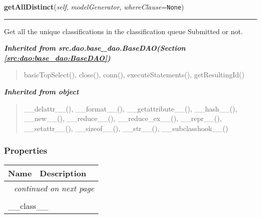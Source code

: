     \vspace{0.5ex}

\hspace{.8\funcindent}\begin{boxedminipage}{\funcwidth}

    \raggedright \textbf{getAllDistinct}(\textit{self}, \textit{modelGenerator}, \textit{whereClause}={\tt None})

    \vspace{-1.5ex}

    \rule{\textwidth}{0.5\fboxrule}
\setlength{\parskip}{2ex}
    Get all the unique classifications in the classification queue 
    Submitted or not.

\setlength{\parskip}{1ex}
    \end{boxedminipage}


\large{\textbf{\textit{Inherited from src.dao.base\_dao.BaseDAO\textit{(Section \ref{src:dao:base_dao:BaseDAO})}}}}

\begin{quote}
basicTopSelect(), close(), conn(), executeStatements(), getResultingId()
\end{quote}

\large{\textbf{\textit{Inherited from object}}}

\begin{quote}
\_\_delattr\_\_(), \_\_format\_\_(), \_\_getattribute\_\_(), \_\_hash\_\_(), \_\_new\_\_(), \_\_reduce\_\_(), \_\_reduce\_ex\_\_(), \_\_repr\_\_(), \_\_setattr\_\_(), \_\_sizeof\_\_(), \_\_str\_\_(), \_\_subclasshook\_\_()
\end{quote}


  \subsubsection{Properties}

    \vspace{-1cm}
\hspace{\varindent}\begin{longtable}{|p{\varnamewidth}|p{\vardescrwidth}|l}
\cline{1-2}
\cline{1-2} \centering \textbf{Name} & \centering \textbf{Description}& \\
\cline{1-2}
\endhead\cline{1-2}\multicolumn{3}{r}{\small\textit{continued on next page}}\\\endfoot\cline{1-2}
\endlastfoot\multicolumn{2}{|l|}{\textit{Inherited from object}}\\
\multicolumn{2}{|p{\varwidth}|}{\raggedright \_\_class\_\_}\\
\cline{1-2}
\end{longtable}

